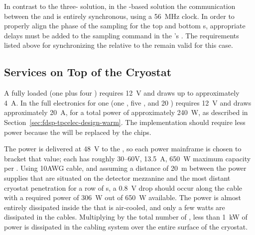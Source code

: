 In contrast to the three- solution, %
in the -based  solution %
the communication between the  and 
 is entirely synchronous, using a \SI{56}{MHz} 
clock. In order to properly align the phase of the
 sampling for the top and bottom s,
appropriate delays must be added to the sampling
command in the 's . %
The requirements listed above for synchronizing 
the  relative to the  remain
valid for this case. %



\subsection{Services on Top of the Cryostat}
\label{sec:fdsp-tpcelec-design-services}

A fully loaded  (one  plus four ) 
requires \SI{12}{V} and draws up to approximately \SI{4}{A}.  In 
 the full electronics for one  (one , 
five , and \num{20} ) requires \SI{12}{V} and 
draws approximately \SI{20}{A}, for a total power of approximately 
\SI{240}{W}, as described in Section~\ref{sec:fdsp-tpcelec-design-warm}. 
The  implementation should require less power because 
the  will be replaced by the  chips.

The  power is delivered at \SI{48}{V} to the , 
so each  power mainframe is chosen to bracket that value; 
each has roughly \numrange{30}{60}{V}, \SI{13.5}{A}, \SI{650}{W} 
maximum capacity per . Using 10AWG cable, and assuming
a distance of \SI{20}{m} between the  power supplies 
that are situated on the detector mezzanine and the most distant
cryostat penetration for a row of s, a \SI{0.8}{V} 
drop should occur along the cable with a required power of 
\SI{306}{W} out of \SI{650}{W} available. The power is almost entirely
dissipated inside the  that is air-cooled, and
only a few watts are dissipated in the cables. Multiplying by
the total number of , %
 less than \SI{1}{kW} of power %
is dissipated in the cabling system over the entire
surface of the cryostat.

